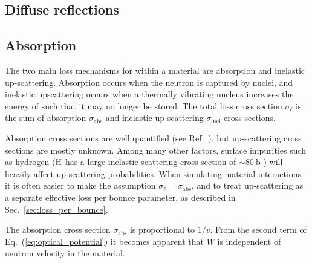 
\subsection{Diffuse reflections}\label{sec:diffuse_reflections}



\subsection{Absorption}\label{sec:ucn_absorption}


The two main loss mechanisms for \ucn within a material are absorption and inelastic up-scattering. Absorption occurs when the neutron is captured by nuclei, and inelastic upscattering occurs when a thermally vibrating nucleus increases the energy of \ucn such that it may no longer be stored. The total loss cross section $\sigma_\ell$ is the sum of absorption $\sigma_\text{abs}$ and inelastic up-scattering $\sigma_\text{inel}$ cross sections.

Absorption cross sections are well quantified (see Ref.~\cite{nist_neutron_cross_sections}), but up-scattering cross sections are mostly unknown. Among many other factors, surface impurities such as hydrogen ($\ce{H}$ has a large inelastic scattering cross section of $\sim \qty{80}{\barn}$ \cite{nist_neutron_cross_sections}) will heavily affect up-scattering probabilities. When simulating \ucn material interactions it is often easier to make the assumption $\sigma_\ell = \sigma_\text{abs}$, and to treat up-scattering as a separate effective loss per bounce parameter, as described in Sec.~\ref{sec:loss_per_bounce}.

The absorption cross section $\sigma_\text{abs}$ is proportional to $1/v$. From the second term of Eq.~(\ref{eq:optical_potential}) it becomes apparent that $W$ is independent of neutron velocity in the material.



